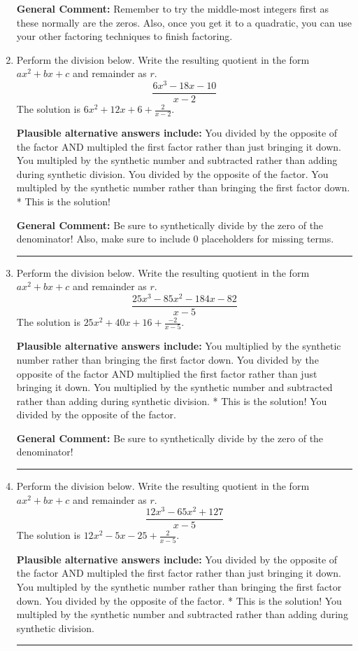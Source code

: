 \documentclass{extbook}[14pt]
\newcommand{\litem}[1]{\item #1

\rule{\textwidth}{0.4pt}}
\begin{document}
\begin{enumerate}
{\textbf{General Comment:} Remember to try the middle-most integers first as these normally are the zeros. Also, once you get it to a quadratic, you can use your other factoring techniques to finish factoring.
}
\litem{
Perform the division below. Write the resulting quotient in the form $ax^2+bx+c$ and remainder as $r$.
\[ \frac{6x^{3} -18 x -10}{x -2} \]The solution is \( 6x^{2} +12 x + 6 + \frac{2}{x -2} \).\begin{enumerate}[label=\Alph*.]
\textbf{Plausible alternative answers include:} You divided by the opposite of the factor AND multipled the first factor rather than just bringing it down.
 You multipled by the synthetic number and subtracted rather than adding during synthetic division.
 You divided by the opposite of the factor.
 You multipled by the synthetic number rather than bringing the first factor down.
* This is the solution!
\end{enumerate}

\textbf{General Comment:} Be sure to synthetically divide by the zero of the denominator! Also, make sure to include 0 placeholders for missing terms.
}
\litem{
Perform the division below. Write the resulting quotient in the form $ax^2+bx+c$ and remainder as $r$.
\[ \frac{25x^{3} -85 x^{2} -184 x -82}{x -5} \]The solution is \( 25x^{2} +40 x + 16 + \frac{-2}{x -5} \).\begin{enumerate}[label=\Alph*.]
\textbf{Plausible alternative answers include:} You multiplied by the synthetic number rather than bringing the first factor down.
 You divided by the opposite of the factor AND multiplied the first factor rather than just bringing it down.
 You multiplied by the synthetic number and subtracted rather than adding during synthetic division.
* This is the solution!
 You divided by the opposite of the factor.
\end{enumerate}

\textbf{General Comment:} Be sure to synthetically divide by the zero of the denominator!
}
\litem{
Perform the division below. Write the resulting quotient in the form $ax^2+bx+c$ and remainder as $r$.
\[ \frac{12x^{3} -65 x^{2} + 127}{x -5} \]The solution is \( 12x^{2} -5 x -25 + \frac{2}{x -5} \).\begin{enumerate}[label=\Alph*.]
\textbf{Plausible alternative answers include:} You divided by the opposite of the factor AND multipled the first factor rather than just bringing it down.
 You multipled by the synthetic number rather than bringing the first factor down.
 You divided by the opposite of the factor.
* This is the solution!
 You multipled by the synthetic number and subtracted rather than adding during synthetic division.
\end{enumerate}

}
\end{enumerate}
\end{document}
